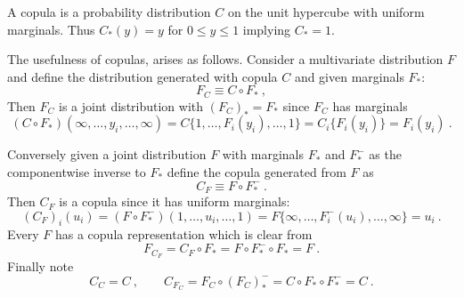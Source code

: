 \documentclass[a4paper,12pt]{article}
\begin{document}
A copula is a probability distribution $C$ on the unit hypercube with uniform marginals.  Thus $C_*(y)=y$ for  $0\le y\le 1$ implying $C_*=1$.

The usefulness of copulas, arises as follows.  Consider a multivariate distribution $F$ and define the distribution generated with copula $C$ and given marginals $F_*$:
 \begin{equation}\label{Fx}
    F_C\equiv C\circ F_*\ ,
\end{equation}
Then $F_C$ is a joint distribution with $(F_C)_*=F_*$ since $F_C$ has marginals
$$
(C\circ F_*)(\infty,\ldots,y_i,\ldots,\infty)= C\{1,\ldots,F_i(y_i),\ldots,1\} = C_i\{F_i(y_i)\}=F_i(y_i)\ .
$$


Conversely given a joint distribution $F$ with marginals $F_*$ and $F_*^-$ as the componentwise inverse to $F_*$ define the copula generated from $F$ as
\begin{equation}\label{Cu}
    C_F\equiv F\circ F_*^-\ .
\end{equation}
Then $C_F$ is a copula since it has uniform marginals:
$$
(C_F)_i(u_i)=(F\circ F_*^-)(1,\ldots,u_i,\ldots,1)= F\{\infty,\ldots,F^-_i(u_i),\ldots,\infty\} = u_i\ .
$$
Every $F$ has a copula representation which is clear from
$$
F_{C_F}= C_F\circ F_*= F\circ F_*^-\circ F_*=F\ .
$$
Finally note
$$
C_C=C\ , \qquad C_{F_C}=F_C\circ (F_C)_*^-=C\circ F_*\circ  F_*^-=C\ .
$$
\end{document}
